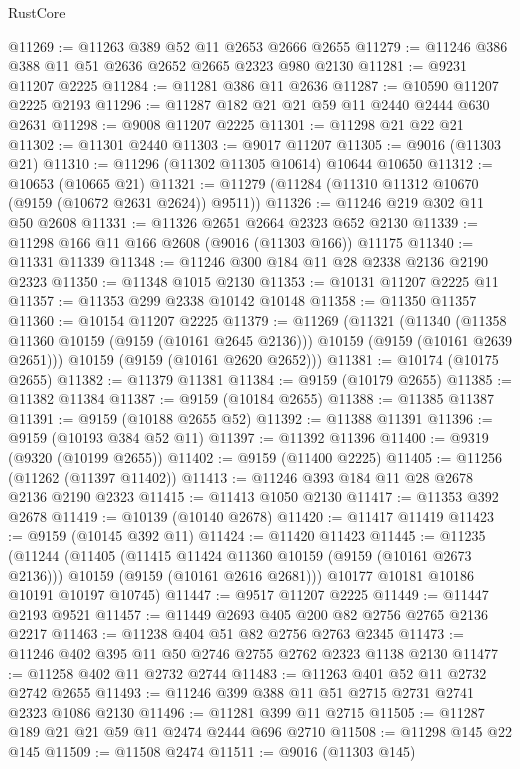 \begin{lexlean}{RustCore}
\begin{coremodule}
@11269 := @11263 @389 @52 @11 @2653 @2666 @2655
@11279 := @11246 @386 @388 @11 @51 @2636 @2652 @2665 @2323 @980 @2130
@11281 := @9231 @11207 @2225
@11284 := @11281 @386 @11 @2636
@11287 := @10590 @11207 @2225 @2193
@11296 := @11287 @182 @21 @21 @59 @11 @2440 @2444 @630 @2631
@11298 := @9008 @11207 @2225
@11301 := @11298 @21 @22 @21
@11302 := @11301 @2440
@11303 := @9017 @11207
@11305 := @9016 (@11303 @21)
@11310 := @11296 (@11302 @11305 @10614) @10644 @10650
@11312 := @10653 (@10665 @21)
@11321 := @11279 (@11284 (@11310 @11312 @10670 (@9159 (@10672 @2631 @2624)) @9511))
@11326 := @11246 @219 @302 @11 @50 @2608
@11331 := @11326 @2651 @2664 @2323 @652 @2130
@11339 := @11298 @166 @11 @166 @2608 (@9016 (@11303 @166)) @11175
@11340 := @11331 @11339
@11348 := @11246 @300 @184 @11 @28 @2338 @2136 @2190 @2323
@11350 := @11348 @1015 @2130
@11353 := @10131 @11207 @2225 @11
@11357 := @11353 @299 @2338 @10142 @10148
@11358 := @11350 @11357
@11360 := @10154 @11207 @2225
@11379 := @11269
    (@11321
      (@11340
        (@11358 @11360 @10159 (@9159 (@10161 @2645 @2136)))
        @10159
        (@9159 (@10161 @2639 @2651)))
      @10159
      (@9159 (@10161 @2620 @2652)))
@11381 := @10174 (@10175 @2655)
@11382 := @11379 @11381
@11384 := @9159 (@10179 @2655)
@11385 := @11382 @11384
@11387 := @9159 (@10184 @2655)
@11388 := @11385 @11387
@11391 := @9159 (@10188 @2655 @52)
@11392 := @11388 @11391
@11396 := @9159 (@10193 @384 @52 @11)
@11397 := @11392 @11396
@11400 := @9319 (@9320 (@10199 @2655))
@11402 := @9159 (@11400 @2225)
@11405 := @11256 (@11262 (@11397 @11402))
@11413 := @11246 @393 @184 @11 @28 @2678 @2136 @2190 @2323
@11415 := @11413 @1050 @2130
@11417 := @11353 @392 @2678
@11419 := @10139 (@10140 @2678)
@11420 := @11417 @11419
@11423 := @9159 (@10145 @392 @11)
@11424 := @11420 @11423
@11445 := @11235
    (@11244
      (@11405
        (@11415 @11424 @11360 @10159 (@9159 (@10161 @2673 @2136)))
        @10159
        (@9159 (@10161 @2616 @2681)))
      @10177
      @10181
      @10186
      @10191
      @10197
      @10745)
@11447 := @9517 @11207 @2225
@11449 := @11447 @2193 @9521
@11457 := @11449 @2693 @405 @200 @82 @2756 @2765 @2136 @2217
@11463 := @11238 @404 @51 @82 @2756 @2763 @2345
@11473 := @11246 @402 @395 @11 @50 @2746 @2755 @2762 @2323 @1138 @2130
@11477 := @11258 @402 @11 @2732 @2744
@11483 := @11263 @401 @52 @11 @2732 @2742 @2655
@11493 := @11246 @399 @388 @11 @51 @2715 @2731 @2741 @2323 @1086 @2130
@11496 := @11281 @399 @11 @2715
@11505 := @11287 @189 @21 @21 @59 @11 @2474 @2444 @696 @2710
@11508 := @11298 @145 @22 @145
@11509 := @11508 @2474
@11511 := @9016 (@11303 @145)

\end{coremodule}
\end{lexlean}
